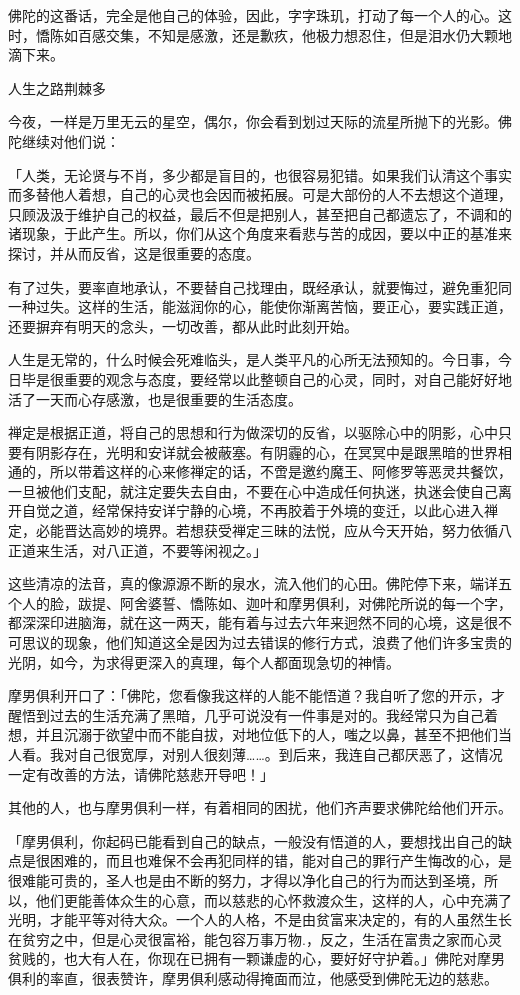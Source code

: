 \documentclass[12pt,twoside,openany]{book}
\begin{document}
佛陀的这番话，完全是他自己的体验，因此，字字珠玑，打动了每一个人的心。这时，憍陈如百感交集，不知是感激，还是歉疚，他极力想忍住，但是泪水仍大颗地滴下来。

人生之路荆棘多

今夜，一样是万里无云的星空，偶尔，你会看到划过天际的流星所抛下的光影。佛陀继续对他们说：

「人类，无论贤与不肖，多少都是盲目的，也很容易犯错。如果我们认清这个事实而多替他人着想，自己的心灵也会因而被拓展。可是大部份的人不去想这个道理，只顾汲汲于维护自己的权益，最后不但是把别人，甚至把自己都遗忘了，不调和的诸现象，于此产生。所以，你们从这个角度来看悲与苦的成因，要以中正的基准来探讨，并从而反省，这是很重要的态度。

有了过失，要率直地承认，不要替自己找理由，既经承认，就要悔过，避免重犯同一种过失。这样的生活，能滋润你的心，能使你渐离苦恼，要正心，要实践正道，还要摒弃有明天的念头，一切改善，都从此时此刻开始。

人生是无常的，什么时候会死难临头，是人类平凡的心所无法预知的。今日事，今日毕是很重要的观念与态度，要经常以此整顿自己的心灵，同时，对自己能好好地活了一天而心存感激，也是很重要的生活态度。

禅定是根据正道，将自己的思想和行为做深切的反省，以驱除心中的阴影，心中只要有阴影存在，光明和安详就会被蔽塞。有阴霾的心，在冥冥中是跟黑暗的世界相通的，所以带着这样的心来修禅定的话，不啻是邀约魔王、阿修罗等恶灵共餐饮，一旦被他们支配，就注定要失去自由，不要在心中造成任何执迷，执迷会使自己离开自觉之道，经常保持安详宁静的心境，不再胶着于外境的变迁，以此心进入禅定，必能晋达高妙的境界。若想获受禅定三昧的法悦，应从今天开始，努力依循八正道来生活，对八正道，不要等闲视之。」

这些清凉的法音，真的像源源不断的泉水，流入他们的心田。佛陀停下来，端详五个人的脸，跋提、阿舍婆誓、憍陈如、迦叶和摩男俱利，对佛陀所说的每一个字，都深深印进脑海，就在这一两天，能有着与过去六年来迥然不同的心境，这是很不可思议的现象，他们知道这全是因为过去错误的修行方式，浪费了他们许多宝贵的光阴，如今，为求得更深入的真理，每个人都面现急切的神情。

摩男俱利开口了：「佛陀，您看像我这样的人能不能悟道？我自听了您的开示，才醒悟到过去的生活充满了黑暗，几乎可说没有一件事是对的。我经常只为自己着想，并且沉溺于欲望中而不能自拔，对地位低下的人，嗤之以鼻，甚至不把他们当人看。我对自己很宽厚，对别人很刻薄……。到后来，我连自己都厌恶了，这情况一定有改善的方法，请佛陀慈悲开导吧！」

其他的人，也与摩男俱利一样，有着相同的困扰，他们齐声要求佛陀给他们开示。

「摩男俱利，你起码已能看到自己的缺点，一般没有悟道的人，要想找出自己的缺点是很困难的，而且也难保不会再犯同样的错，能对自己的罪行产生悔改的心，是很难能可贵的，圣人也是由不断的努力，才得以净化自己的行为而达到圣境，所以，他们更能善体众生的心意，而以慈悲的心怀救渡众生，这样的人，心中充满了光明，才能平等对待大众。一个人的人格，不是由贫富来决定的，有的人虽然生长在贫穷之中，但是心灵很富裕，能包容万事万物.，反之，生活在富贵之家而心灵贫贱的，也大有人在，你现在已拥有一颗谦虚的心，要好好守护着。」佛陀对摩男俱利的率直，很表赞许，摩男俱利感动得掩面而泣，他感受到佛陀无边的慈悲。
\end{document}
